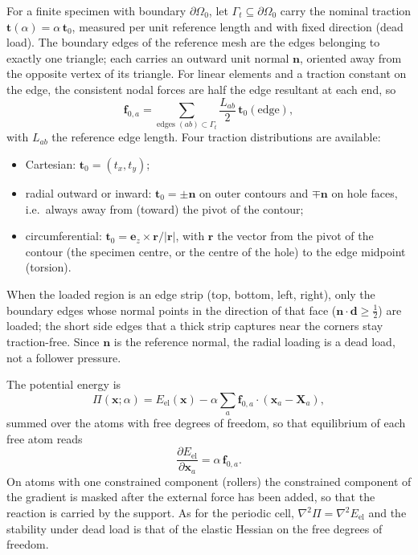\documentclass[11pt,a4paper]{article}
\newcommand{\x}{\mathbf x}
\newcommand{\X}{\mathbf X}
\newcommand{\f}{\mathbf f}
\begin{document}
For a finite specimen with boundary \(\partial\Omega_0\), let \(\Gamma_t\subseteq\partial\Omega_0\)
carry the nominal traction \(\mathbf t(\alpha)=\alpha\,\mathbf t_0\), measured per unit reference
length and with fixed direction (dead load). The boundary edges of the reference mesh are the edges
belonging to exactly one triangle; each carries an outward unit normal \(\mathbf n\), oriented away
from the opposite vertex of its triangle. For linear elements and a traction constant on the edge,
the consistent nodal forces are half the edge resultant at each end, so
\begin{equation}
  \f_{0,a}=\sum_{\text{edges } (ab)\subset\Gamma_t}\frac{L_{ab}}{2}\,\mathbf t_0(\text{edge}),
  \label{eq:f0}
\end{equation}
with \(L_{ab}\) the reference edge length. Four traction distributions are available:
\begin{itemize}
  \item Cartesian: \(\mathbf t_0=(t_x,t_y)\);
  \item radial outward or inward: \(\mathbf t_0=\pm\mathbf n\) on outer contours and
        \(\mp\mathbf n\) on hole faces, i.e.\ always away from (toward) the pivot of the contour;
  \item circumferential: \(\mathbf t_0=\mathbf e_z\times\mathbf r/|\mathbf r|\), with
        \(\mathbf r\) the vector from the pivot of the contour (the specimen centre, or the centre
        of the hole) to the edge midpoint (torsion).
\end{itemize}
When the loaded region is an edge strip (top, bottom, left, right), only the boundary edges whose
normal points in the direction of that face (\(\mathbf n\cdot\mathbf d\geq\tfrac12\)) are loaded;
the short side edges that a thick strip captures near the corners stay traction-free. Since
\(\mathbf n\) is the reference normal, the radial loading is a dead load, not a follower pressure.

The potential energy is
\begin{equation}
  \Pi(\x;\alpha)=E_{\mathrm{el}}(\x)-\alpha\sum_a\f_{0,a}\cdot(\x_a-\X_a),
  \label{eq:Pi}
\end{equation}
summed over the atoms with free degrees of freedom, so that equilibrium of each free atom reads
\begin{equation}
  \frac{\partial E_{\mathrm{el}}}{\partial\x_a}=\alpha\,\f_{0,a}.
\end{equation}
On atoms with one constrained component (rollers) the constrained component of the gradient is
masked after the external force has been added, so that the reaction is carried by the support.
As for the periodic cell, \(\nabla^2\Pi=\nabla^2E_{\mathrm{el}}\) and the stability under dead load is
that of the elastic Hessian on the free degrees of freedom.
\end{document}
